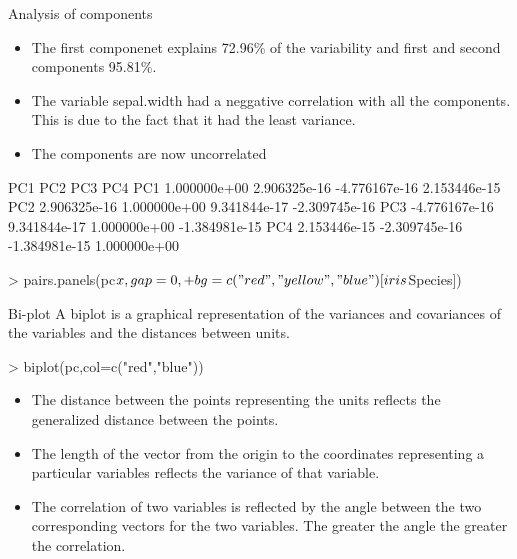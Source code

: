 \documentclass[10pt]{beamer}
\begin{document}
\begin{frame}[fragile]{Analysis of components}
\begin{itemize}
\item The first componenet explains 72.96\% of the variability and first and second components 95.81\%.
\item The variable sepal.width had a neggative correlation with all the components. This is due to the fact that it had the least variance.
\item The components are now uncorrelated
\end{itemize}
\begin{Schunk}
\begin{Soutput}
              PC1           PC2           PC3           PC4
PC1  1.000000e+00  2.906325e-16 -4.776167e-16  2.153446e-15
PC2  2.906325e-16  1.000000e+00  9.341844e-17 -2.309745e-16
PC3 -4.776167e-16  9.341844e-17  1.000000e+00 -1.384981e-15
PC4  2.153446e-15 -2.309745e-16 -1.384981e-15  1.000000e+00
\end{Soutput}
\begin{Sinput}
> pairs.panels(pc$x,gap=0,
+              bg=c("red","yellow","blue")[iris$Species])
\end{Sinput}
\end{Schunk}

\end{frame}

\begin{frame}[fragile]{Bi-plot}
A biplot is a graphical representation of the variances and covariances of the variables and the distances between units.
\begin{Schunk}
\begin{Sinput}
> biplot(pc,col=c("red","blue"))
\end{Sinput}
\end{Schunk}
\begin{itemize}
\item The distance between the points representing the units reflects the generalized distance between the points.
\item The length of the vector from the origin to the coordinates representing a particular variables reflects the variance of that variable.
\item The correlation of two variables is reflected by the angle between the two corresponding vectors for the two variables. The greater the angle the greater the correlation.
\end{itemize}
\end{frame}
\end{document}
